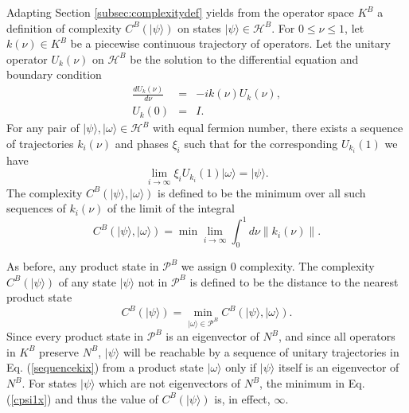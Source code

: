 \documentclass[twocolumn,amsmath,amssymb]{revtex4-1}
\begin{document}
Adapting Section \ref{subsec:complexitydef} yields from
the operator space $K^B$ a definition of complexity $C^B( |\psi \rangle )$ on states $|\psi \rangle  \in \mathcal{H}^B$.
For $0 \leq \nu \leq 1$, let $k( \nu) \in K^B$ be a piecewise continuous trajectory of operators.
Let the unitary operator $U_k(\nu)$ on $\mathcal{H}^B$ be the solution to the differential
equation and boundary condition
\begin{subequations}
\begin{eqnarray}
\label{udotx}
\frac{dU_k(\nu)}{d \nu} & = &-i k( \nu) U_k( \nu), \\
\label{uboundary0x}
U_k( 0) & = & I.
\end{eqnarray}
\end{subequations}
For any pair of $|\psi \rangle , |\omega \rangle  \in \mathcal{H}^B$ with equal
fermion number, there 
exists a sequence of trajectories $k_i(\nu)$ and phases $\xi_i$ such that for the corresponding
$U_{k_i}(1)$ we have
\begin{equation}
\label{sequencekix}
\lim_{i \rightarrow \infty} \xi_i U_{k_i}(1) |\omega \rangle  = |\psi \rangle .
\end{equation}
The complexity $C^B(|\psi \rangle , |\omega \rangle )$ is defined to be the minimum 
over all such sequences of $k_i(\nu)$ of the
limit of the integral
\begin{equation}
\label{complexityx}
C^B(| \psi \rangle , |\omega \rangle ) = \min \lim_{i \rightarrow \infty} \int_0^1 d \nu \parallel k_i( \nu) \parallel. 
\end{equation}

As before, any product state in $\mathcal{P}^B$ we assign 0 complexity. 
The complexity $C^B( |\psi \rangle )$ of any state $|\psi \rangle $ not in $\mathcal{P}^B$
is defined to be the distance to the nearest product state
\begin{equation}
\label{cpsi1x}
C^B( |\psi \rangle ) = \min_{|\omega \rangle  \in \mathcal{P}^B} C^B(| \psi \rangle , |\omega \rangle ).
\end{equation}
Since every product state in $\mathcal{P}^B$ is an eigenvector of $N^B$,
and since all operators in $K^B$ preserve $N^B$,  $|\psi \rangle $ will be reachable by
a sequence of unitary trajectories in Eq. (\ref{sequencekix}) from a product
state $|\omega \rangle $ only if $|\psi \rangle $ itself is an eigenvector of $N^B$.
For states $|\psi \rangle $ which are not eigenvectors of $N^B$, the minimum
in Eq. (\ref{cpsi1x}) and thus the value of $C^B(|\psi \rangle )$ is, in effect, $\infty$.
\end{document}
